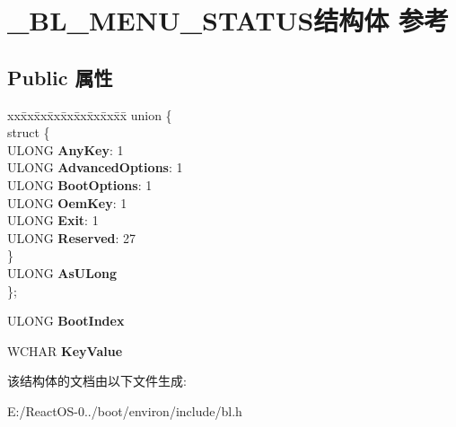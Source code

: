 \hypertarget{struct___b_l___m_e_n_u___s_t_a_t_u_s}{}\section{\+\_\+\+B\+L\+\_\+\+M\+E\+N\+U\+\_\+\+S\+T\+A\+T\+U\+S结构体 参考}
\label{struct___b_l___m_e_n_u___s_t_a_t_u_s}
\subsection*{Public 属性}
\begin{DoxyCompactItemize}
\item 
\mbox{\label{struct___b_l___m_e_n_u___s_t_a_t_u_s_a19736a2817a1e1fe0396db463fc52022}} 
\begin{tabbing}
xx\=xx\=xx\=xx\=xx\=xx\=xx\=xx\=xx\=\kill
union \{\\
\mbox{\label{union___b_l___m_e_n_u___s_t_a_t_u_s_1_1_0D111_ac820a16d775dd354779648708734a166}} 
\>struct \{\\
\>\>ULONG {\bfseries AnyKey}: 1\\
\>\>ULONG {\bfseries AdvancedOptions}: 1\\
\>\>ULONG {\bfseries BootOptions}: 1\\
\>\>ULONG {\bfseries OemKey}: 1\\
\>\>ULONG {\bfseries Exit}: 1\\
\>\>ULONG {\bfseries Reserved}: 27\\
\>\} \\
\>ULONG {\bfseries AsULong}\\
\}; \\

\end{tabbing}\item 
\mbox{\label{struct___b_l___m_e_n_u___s_t_a_t_u_s_a9b2fa3c52a20047b2bac9c2ac0d07846}} 
U\+L\+O\+NG {\bfseries Boot\+Index}
\item 
\mbox{\label{struct___b_l___m_e_n_u___s_t_a_t_u_s_a3aafbdb675960a826439545c56adeec0}} 
W\+C\+H\+AR {\bfseries Key\+Value}
\end{DoxyCompactItemize}


该结构体的文档由以下文件生成\+:\begin{DoxyCompactItemize}
\item 
E\+:/\+React\+O\+S-\/0../boot/environ/include/bl.\+h\end{DoxyCompactItemize}
